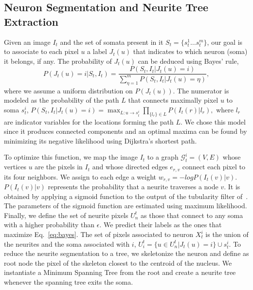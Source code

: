 \subsection{Neuron Segmentation and Neurite Tree Extraction}
\label{sec:segmentation}
\vspace{-2mm} Given an image $I_t$ and the set of
somata present in it $S_t=\{s_t^1 \dots s_t^m \}$,
our goal is to associate to each pixel $u$ a label
$J_t(u)$ that indicates to which neuron (soma) it
belongs, if any.  The probability of $J_t(u)$ can
be deduced using Bayes' rule,
\begin{equation}
  \label{eq:bayes}
  P(J_t(u)=i|S_t,I_t) = \frac{P(S_t,I_t| J_t(u)=i)}{\sum_{\eta=1}^m P(S_t,I_t|J_t(u)=\eta)},
\end{equation}
\noindent where we assume a uniform distribution
on $P(J_t(u))$.  The numerator is modeled as the
probability of the path $L$ that connects
maximally pixel $u$ to soma $s_t^i$, $ P(S_t,I_t|
J_t(u)=i) = \max_{L:u\rightarrow s_t^i}
\prod_{\{l_{r}\} \in L } P(I_t(r)|l_{r}),$ where
$l_{r}$ are indicator variables for the locations
forming the path $L$.  We chose this model since
it produces connected components and an optimal
maxima can be found by minimizing its negative
likelihood using Dijkstra's shortest path.

To optimize this function, we map the image $I_t$
to a graph $\mathcal{G}_t^i = (V,E)$ whose
vertices $u$ are the pixels in $I_t$ and whose
directed edges $e_{r,v}$ connect each pixel to its
four neighbors.  We assign to each edge a weight
$w_{r,v} = -log P(I_t(v)|v)$.  $P(I_t(v)|v)$
represents the probability that a neurite
traverses a node $v$.  It is obtained by applying
a sigmoid function to the output of the tubularity
filter of~\cite{Frangi98}.  The parameters of the
sigmoid function are estimated using maximum
likelihood. Finally, we define the set of neurite
pixels $U_n^t$ as those that connect to any soma
with a higher probability than $\epsilon$.  We
predict their labels as the ones that maximize
Eq.~\ref{eq:bayes}.  The set of pixels associated
to neuron $X_t^i$ is the union of the neurites and
the soma associated with $i$, $ U_i^t = \{u \in
U_n^t | J_t(u) = i\} \cup s_t^i$. To reduce the
neurite segmentation to a tree, we skeletonize the
neuron and define as root node the pixel of the
skeleton closest to the centroid of the nucleus.
We instantiate a Minimum Spanning Tree from the
root and create a neurite tree whenever the
spanning tree exits the soma.




